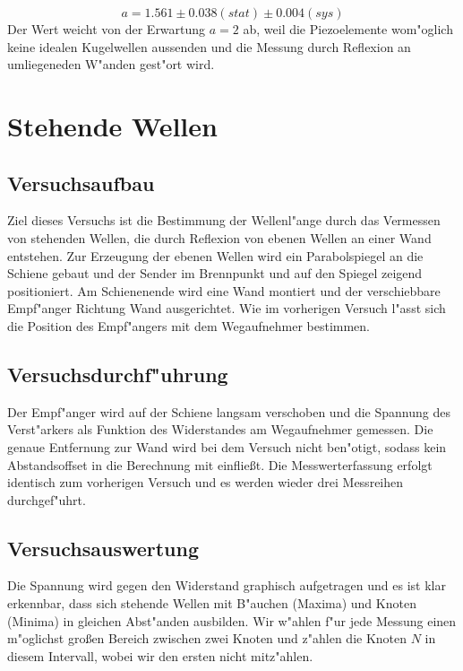\documentclass[12pt,a4paper]{article}
\begin{document}
\begin{equation}
a=1.561\pm0.038(stat)\pm0.004(sys)
\end{equation}
Der Wert weicht von der Erwartung $a=2$ ab, weil die Piezoelemente wom"oglich keine idealen Kugelwellen aussenden und die Messung durch Reflexion an umliegeneden W"anden gest"ort wird.


\section{Stehende Wellen}

\subsection{Versuchsaufbau}
Ziel dieses Versuchs ist die Bestimmung der Wellenl"ange durch das Vermessen von stehenden Wellen, die durch Reflexion von ebenen Wellen an einer Wand entstehen.
Zur Erzeugung der ebenen Wellen wird ein Parabolspiegel an die Schiene gebaut und der Sender im Brennpunkt und auf den Spiegel zeigend positioniert. Am Schienenende wird eine Wand montiert und der verschiebbare Empf"anger Richtung Wand ausgerichtet. Wie im vorherigen Versuch l"asst sich die Position des Empf"angers mit dem Wegaufnehmer bestimmen.

\subsection{Versuchsdurchf"uhrung}
Der Empf"anger wird auf der Schiene langsam verschoben und die Spannung des Verst"arkers als Funktion des Widerstandes am Wegaufnehmer gemessen. Die genaue Entfernung zur Wand wird bei dem Versuch nicht ben"otigt, sodass kein Abstandsoffset in die Berechnung mit einflie\ss t.
Die Messwerterfassung erfolgt identisch zum vorherigen Versuch und es werden wieder drei Messreihen durchgef"uhrt.

\subsection{Versuchsauswertung}
Die Spannung wird gegen den Widerstand graphisch aufgetragen und es ist klar erkennbar, dass sich stehende Wellen mit B"auchen (Maxima) und Knoten (Minima) in gleichen Abst"anden ausbilden. Wir w"ahlen  f"ur jede Messung einen m"oglichst gro\ss en Bereich zwischen zwei Knoten und z"ahlen die Knoten $N$ in diesem Intervall, wobei wir den ersten nicht mitz"ahlen. 
\end{document}
